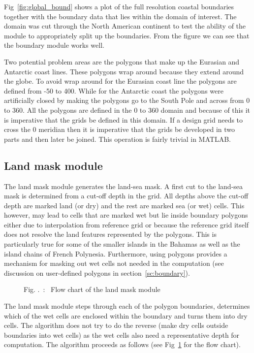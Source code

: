 \documentclass[12pt]{article}
\newcounter{myfigno}[section]
\newenvironment{myfig}[1]{\begin{figure}[#1]
                        \refstepcounter{myfigno}}
                       {\end{figure}}
\newcommand{\myfcapc}[1]{\begin{center} \ff Fig. \themyfigno\ :~ #1
                        \end{center}}
\renewcommand{\themyfigno}{\thesection.\arabic{myfigno}}
\begin{document}
Fig~\ref{fig:global_bound} shows a plot of the full resolution coastal boundaries together with the boundary data that lies within the domain of interest. The domain was cut through the North American continent to test the ability of the module to appropriately split up the boundaries. From the figure we can see that the boundary module works well.

Two potential problem areas are the polygons that make up the Eurasian and Antarctic coast lines. These polygons wrap around because they extend around the globe. To avoid wrap around for the Eurasian coast line the polygons are defined from -50 to 400. While for the Antarctic coast the polygons were artificially closed by making the polygons go to the South Pole and across from 0 to 360. All the polygons are defined in the 0 to 360 domain and because of this it is imperative that the grids be defined in this domain. If a design grid needs to cross the 0 meridian then it is imperative that the grids be developed in two parts and then later be joined. This operation is fairly trivial in MATLAB. 
 
\subsection{Land mask module}
\label{sc:land_mask}

The land mask module generates the land-sea mask. A first cut to the land-sea mask is determined from a cut-off depth in the grid. All depths above the cut-off depth are marked land (or dry) and the rest are marked sea (or wet) cells. This however, may lead to cells that are marked wet but lie inside boundary polygons either due to interpolation from reference grid or because the reference grid itself does not resolve the land features represented by the polygons. This is particularly true for some of the smaller islands in the Bahamas as well as the island chains of French Polynesia. Furthermore, using polygons provides a mechanism for masking out wet cells not needed in the computation (see discussion on user-defined polygons in section~\ref{sc:boundary}).
 
\begin{myfig}{tbp}
\centerline{}
\myfcapc{Flow chart of the land mask module}
\label{fig:landmask_module}
\end{myfig}

The land mask module steps through each of the polygon boundaries, determines which of the wet cells are enclosed within the boundary and turns them into dry cells. The algorithm does not try to do the reverse (make dry cells outside boundaries into wet cells) as the wet cells also need a representative depth for computation. The algorithm proceeds as follows (see Fig~\ref{fig:landmask_module} for the flow chart). 
 
\end{document}
